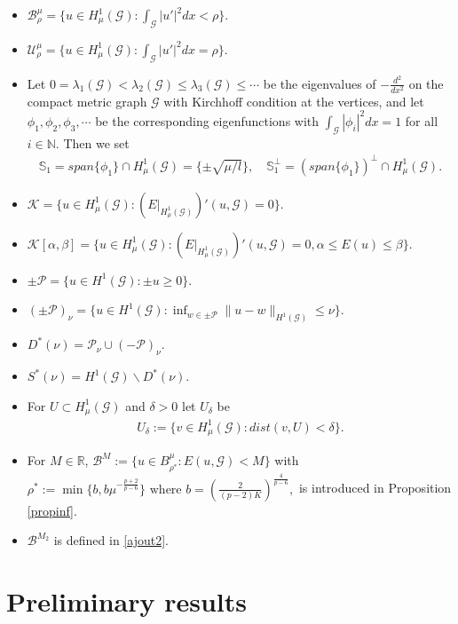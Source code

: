 \documentclass[10pt,a4paper]{article}
\theoremstyle{definition} \theoremstyle{remark}
\numberwithin{equation}{section}
\newcommand{\G}{\mathcal{G}}
\newcommand{\R}{\mathbb{R}}
\newcommand{\N}{\mathbb{N}}
\newcommand{\B}{\mathcal{B}}
\newcommand{\U}{\mathcal{U}}
\newcommand{\K}{\mathcal{K}}
\newcommand{\p}{\mathcal{P}}
\newcommand{\s}{\mathbb{S}}
\newcommand{\la}{\lambda}
\begin{document}
\vskip0.1in
\begin{itemize}
\item $\B_\rho^\mu = \bigl\{u \in H^1_\mu(\G): \int_\G|u'|^2dx < \rho\bigr\}.$
\item $\U_\rho^\mu = \bigl\{u \in H^1_\mu(\G): \int_\G|u'|^2dx = \rho\bigr\}.$
\item Let $0=\la_1(\G) < \la_2(\G) \leq \la_3(\G) \leq \cdots $ be the eigenvalues of $-\frac{d^2}{dx^2}$ on the compact metric graph $\G$ with Kirchhoff condition at the vertices, and let $\phi_1, \phi_2, \phi_3, \cdots$ be the corresponding eigenfunctions with $\int_\G|\phi_i|^2dx = 1$ for all $i \in \N$. Then we set
\begin{align*}
	\s_1 = span\{\phi_1\} \cap H^1_\mu(\G) = \{\pm \sqrt{\mu/l}\}, \quad \s_1^\perp = (span\{\phi_1\})^\perp \cap H^1_\mu(\G).
\end{align*}
\item $\K = \bigl\{u \in H^1_\mu(\G): (E|_{H^1_\mu(\G)})'(u,\G) = 0\bigl\}.$
\item  $\K[\alpha,\beta] = \bigl\{u \in H^1_\mu(\G): (E|_{H^1_\mu(\G)})'(u,\G) = 0, \alpha \leq E(u) \leq \beta\bigr\}.$
\item $\pm \p = \bigl\{u \in H^1(\G): \pm u \geq 0\bigl\}.$
\item $(\pm \p)_\nu = \bigl\{u \in H^1(\G): \inf_{w \in \pm \p}\|u -w\|_{H^1(\G)} \le \nu\bigr\}$.
\item  $D^*(\nu) =  \p_\nu \cup(-\p)_\nu$.
\item  $S^*(\nu) = H^1(\G) \backslash D^*(\nu)$.
\item  For $U \subset H^1_\mu(\G)$ and $\delta >0$ let $U_{\delta}$ be 
	\begin{align}
		U_{\delta} := \bigl\{v \in H^1_\mu(\G): dist(v, U) < \delta\bigr\}.
	\end{align}
\item  For $M \in \R$, $\B^M := \{u \in B_{\rho^*}^{\mu} : E(u, \G) < M\}$ with $\rho^*  := \min\{b,b\mu^{-\frac{p+2}{p-6}}\} \text{ where } b = \left( \frac2{(p-2)K}\right)^{\frac4{p-6}},$ is introduced in Proposition \ref{propinf}.
\item $\B^{M_2}$ is defined in \eqref{ajout2}.
\end{itemize}

\section{Preliminary results} \label{secpre}
\end{document}
